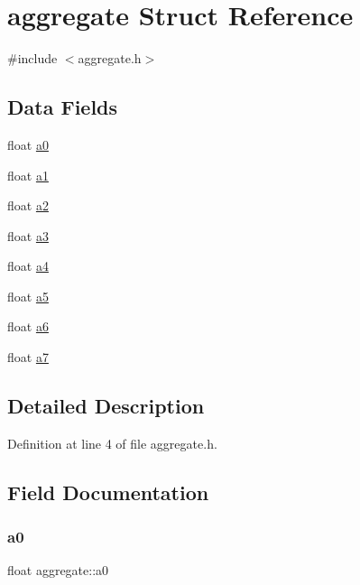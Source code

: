 \hypertarget{structaggregate}{}\section{aggregate Struct Reference}
\label{structaggregate}


{\ttfamily \#include $<$aggregate.\+h$>$}

\subsection*{Data Fields}
\begin{DoxyCompactItemize}
\item 
float \hyperlink{structaggregate_aedd9bc0b4313521fd7b7d3dc3fd03f9e}{a0}
\item 
float \hyperlink{structaggregate_a2c2033e1ef77b1a486c79284b5d65292}{a1}
\item 
float \hyperlink{structaggregate_a70e3edacc701c61f5c0c80f1b35f5605}{a2}
\item 
float \hyperlink{structaggregate_a1ec20aa5517958edc71428cfe8d5facb}{a3}
\item 
float \hyperlink{structaggregate_acebb4586be57a0b97091e23079ec6e52}{a4}
\item 
float \hyperlink{structaggregate_a11c778cbf47725b761e66de82d41c80a}{a5}
\item 
float \hyperlink{structaggregate_acf18c60ca06522b5e4d39f7c2c2c5035}{a6}
\item 
float \hyperlink{structaggregate_a90c229b52c2d5e61e8fb5427d92c20b7}{a7}
\end{DoxyCompactItemize}


\subsection{Detailed Description}


Definition at line 4 of file aggregate.\+h.



\subsection{Field Documentation}
\mbox{\label{structaggregate_aedd9bc0b4313521fd7b7d3dc3fd03f9e}} 
\subsubsection{\texorpdfstring{a0}{a0}}
{\footnotesize\ttfamily float aggregate\+::a0}



